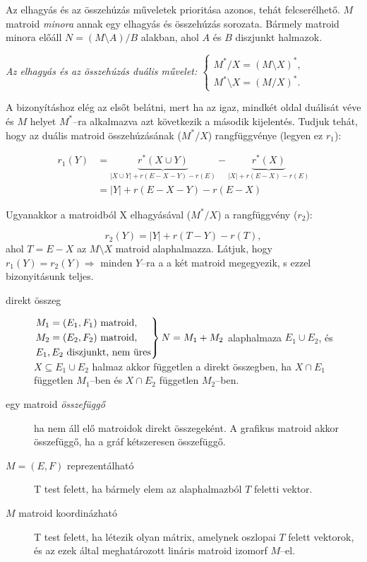 Az elhagyás és az összehúzás műveletek prioritása azonos, tehát felcserélhető.
$M$ matroid \emph{minora} annak egy elhagyás és összehúzás sorozata. Bármely matroid minora előáll
$N=(M \setminus A) / B$ alakban, ahol $A$ és $B$ diszjunkt halmazok.

\emph{Az elhagyás és az összehúzás duális művelet: $\begin{cases}
			M^*/X=(M \setminus X)^*, \\
			M^* \setminus X = (M / X)^*.
		\end{cases}$}

A bizonyításhoz elég az elsőt belátni, mert ha az igaz, mindkét oldal duálisát
véve és $M$ helyet $M^*$--ra alkalmazva azt következik a második kijelentés.
Tudjuk tehát, hogy az duális matroid összehúzásának ($M^*/X$) rangfüggvénye
(legyen ez $r_1$):

\begin{align*}
	r_1(Y) & =\underbrace{r^*(X \cup Y)}_{|X \cup Y| + r(E-X-Y) - r(E)} -
	\underbrace{r^*(X)}_{|X| + r(E-X) - r(E)}                             \\
	       & = |Y| + r(E-X-Y) - r(E-X)
\end{align*}

Ugyanakkor a matroidból X elhagyásával ($M^*/X$) a rangfüggvény ($r_2$):

\[ r_2(Y) = |Y| + r(T-Y) - r(T),\] ahol $T = E-X$ az $M\setminus X$ matroid
alaphalmazza. Látjuk, hogy $r_1(Y)=r_2(Y)\Rightarrow$ minden $Y$--ra a a két
matroid megegyezik, s ezzel bizonyitásunk teljes.

\begin{description}
	\item[direkt összeg] $\begin{rcases}
			      M_1=(E_1,F_1) \mbox{ matroid}, \\
			      M_2=(E_2,F_2) \mbox{ matroid}, \\
			      E_1, E_2 \mbox{ diszjunkt, nem üres}\end{rcases} N = M_1+ M_2$ alaphalmaza
	      $E_1 \cup E_2$, és $X \subseteq E_1 \cup E_2$ halmaz akkor független a direkt
	      összegben, ha $X \cap E_1$ független $M_1$--ben és $X \cap E_2$ független
	      $M_2$--ben.
	\item[egy matroid \emph{összefüggő}] ha nem áll elő matroidok direkt
	      összegeként. A grafikus matroid akkor összefüggő, ha a gráf kétszeresen
	      összefüggő.
	\item[$M=(E,F)$ reprezentálható] T test felett, ha bármely elem az alaphalmazból
	      $T$ feletti vektor.
	\item[$M$ matroid koordinázható]T test felett, ha létezik olyan mátrix, amelynek oszlopai
	      $T$ felett vektorok, és az ezek által meghatározott lináris matroid izomorf
	      $M$--el.
\end{description}

